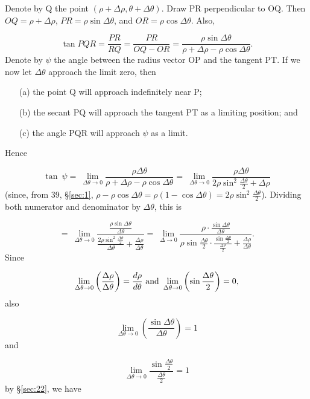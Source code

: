 Denote by Q the point 
$(\rho + \Delta \rho,\theta + \Delta \theta)$. Draw PR perpendicular to OQ. Then 
$OQ = \rho + \Delta \rho$, $PR = \rho \sin\Delta \theta$, and $OR = \rho \cos\Delta \theta$. 
Also,

\[
    \tan PQR = \frac{PR}{RQ} 
= \frac{PR}{OQ - OR} 
= \frac{\rho \sin \Delta \theta}{\rho + \Delta \rho - \rho \cos \Delta \theta}.
\]
Denote by $\psi$ the angle between the radius vector OP and the 
tangent PT. If we now let $\Delta \theta$ approach the limit zero, then

\begin{itemize}

\item[(a)] 
the point Q will approach indefinitely near P;

\item[(b)] 
the secant PQ will approach the tangent PT as a limiting position; and

\item[(c)] 
the angle PQR will approach $\psi$ as a limit.
\end{itemize}

Hence

\[
\tan\ \psi 	
=\ \lim_{\Delta \theta \to 0} \frac{\rho \Delta \theta}{\rho + \Delta \rho - \rho \cos \Delta \theta}
=\ \lim_{\Delta \theta \to 0} \frac{\rho \Delta \theta}{2 \rho \sin^2 \frac{\Delta \theta}{2} + \Delta \rho}
\]
(since, from 39, \S \ref{sec:1},
$\rho - \rho \cos \Delta \theta 
= \rho (1 - \cos \Delta \theta)= 2 \rho \sin^2 \frac{\Delta \theta}{2}$).
Dividing both numerator and denominator by $\Delta \theta$, this is

\[
=\ \lim_{\Delta \theta \to 0} \frac{\frac{\rho \sin \Delta \theta}{\Delta \theta}}{\frac{2 \rho \sin^2 \frac{\Delta \theta}{2}}{\Delta \theta} + \frac{\Delta \rho}{\Delta \theta}}
=\ \lim_{\Delta \to 0} \frac{\rho \cdot \frac{\sin \Delta \theta}{\Delta \theta}}{\rho \sin \frac{\Delta \theta}{2} \cdot \frac{\sin \frac{\Delta \theta}{2}}{\frac{\Delta \theta}{2}} + \frac{\Delta \rho}{\Delta \theta}}.
\]
Since 

\[
\lim_{\Delta \theta \to 0} \left ( \frac{\Delta \rho}{\Delta \theta} \right ) 
= \frac{d\rho}{d\theta}\ {\rm and}\ \lim_{\Delta \theta \to 0} \left ( \sin \frac{\Delta \theta}{2} \right ) 
= 0,
\]
also 

\[
\lim_{\Delta \theta \to 0} \left ( \frac{\sin \Delta \theta}{\Delta \theta} \right ) = 1
\]
and 

\[
\lim_{\Delta \theta \to 0} \frac{\sin \frac{\Delta \theta}{2}}{\frac{\Delta \theta}{2}} = 1
\] 
by \S \ref{sec:22}, %
we have

